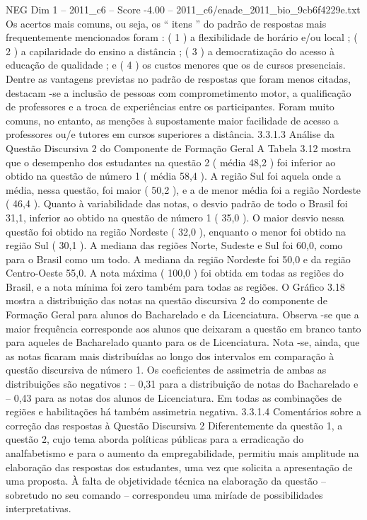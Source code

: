 \begin{textsample}{NEG Dim 1 – 2011\_c6 – Score -4.00 – 2011\_c6/enade\_2011\_bio\_9cb6f4229e.txt}
Os acertos mais comuns, ou seja, os “ itens ” do padrão de respostas mais frequentemente mencionados foram : ( 1 ) a flexibilidade de horário e/ou local ; ( 2 ) a capilaridade do ensino a distância ; ( 3 ) a democratização do acesso à educação de qualidade ; e ( 4 ) os custos menores que os de cursos presenciais.
Dentre as vantagens previstas no padrão de respostas que foram menos citadas, destacam -se a inclusão de pessoas com comprometimento motor, a qualificação de professores e a troca de experiências entre os participantes.
Foram muito comuns, no entanto, as menções à supostamente maior facilidade de acesso a professores ou/e tutores em cursos superiores a distância. 3.3.1.3 Análise da Questão Discursiva 2 do Componente de Formação Geral A Tabela 3.12 mostra que o desempenho dos estudantes na questão 2 ( média 48,2 ) foi inferior ao obtido na questão de número 1 ( média 58,4 ).
A região Sul foi aquela onde a média, nessa questão, foi maior ( 50,2 ), e a de menor média foi a região Nordeste ( 46,4 ).
Quanto à variabilidade das notas, o desvio padrão de todo o Brasil foi 31,1, inferior ao obtido na questão de número 1 ( 35,0 ).
O maior desvio nessa questão foi obtido na região Nordeste ( 32,0 ), enquanto o menor foi obtido na região Sul ( 30,1 ).
A mediana das regiões Norte, Sudeste e Sul foi 60,0, como para o Brasil como um todo.
A mediana da região Nordeste foi 50,0 e da região Centro-Oeste 55,0.
A nota máxima ( 100,0 ) foi obtida em todas as regiões do Brasil, e a nota mínima foi zero também para todas as regiões.
O Gráfico 3.18 mostra a distribuição das notas na questão discursiva 2 do componente de Formação Geral para alunos do Bacharelado e da Licenciatura.
Observa -se que a maior frequência corresponde aos alunos que deixaram a questão em branco tanto para aqueles de Bacharelado quanto para os de Licenciatura.
Nota -se, ainda, que as notas ficaram mais distribuídas ao longo dos intervalos em comparação à questão discursiva de número 1.
Os coeficientes de assimetria de ambas as distribuições são negativos : – 0,31 para a distribuição de notas do Bacharelado e – 0,43 para as notas dos alunos de Licenciatura.
Em todas as combinações de regiões e habilitações há também assimetria negativa. 3.3.1.4 Comentários sobre a correção das respostas à Questão Discursiva 2 Diferentemente da questão 1, a questão 2, cujo tema aborda políticas públicas para a erradicação do analfabetismo e para o aumento da empregabilidade, permitiu mais amplitude na elaboração das respostas dos estudantes, uma vez que solicita a apresentação de uma proposta.
À falta de objetividade técnica na elaboração da questão – sobretudo no seu comando – correspondeu uma miríade de possibilidades interpretativas.

\end{textsample}
